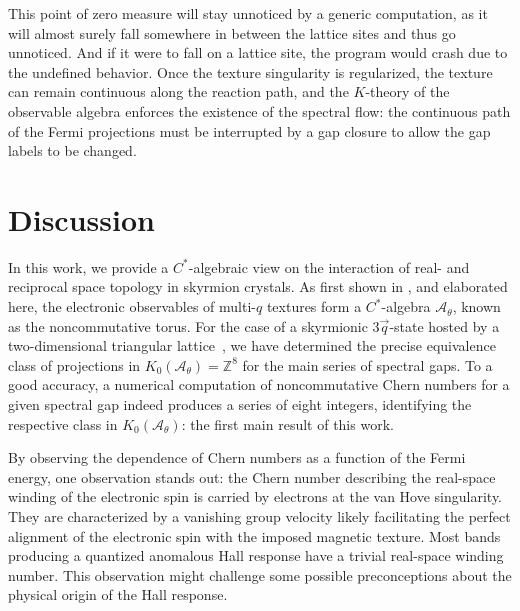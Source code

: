 \documentclass[submission, Phys]{SciPost}
\begin{document}
This point of zero measure will stay unnoticed by a generic computation, as it will almost surely fall somewhere in between the lattice sites and thus go unnoticed.
And if it were to fall on a lattice site, the program would crash due to the undefined behavior.
Once the texture singularity is regularized, the texture can remain continuous along the reaction path, and the $K$-theory of the observable algebra enforces the existence of the spectral flow: the continuous path of the Fermi projections must be interrupted by a gap closure to allow the gap labels to be changed.

\section{Discussion}
\label{sec:conclusion}

In this work, we provide a $C^\ast$-algebraic view on the interaction of real- and reciprocal space topology in skyrmion crystals.
As first shown in \cite{Lux2024}, and elaborated here, the electronic observables of multi-$q$ textures form a $C^\ast$-algebra $\mathcal{A}_\theta$, known as the noncommutative torus. 
For the case of a skyrmionic $3\vec{q}$-state hosted by a two-dimensional triangular lattice~\cite{Gobel2017, Gobel2017b}, we have determined the precise equivalence class of projections in $K_0(\mathcal{A}_\theta)=\mathbb{Z}^8$ for the main series of spectral gaps. 
To a good accuracy, a numerical computation of noncommutative Chern numbers for a given spectral gap indeed produces a series of eight integers, identifying the respective class in $K_0(\mathcal{A}_\theta)$:
the first main result of this work.

By observing the dependence of Chern numbers as a function of the Fermi energy, one observation stands  out:
the Chern number describing the real-space winding of the electronic spin is carried by electrons at the van Hove singularity.
They are characterized by a vanishing group velocity likely facilitating the perfect alignment of the electronic spin with the imposed magnetic texture. 
Most bands producing a quantized anomalous Hall response have a trivial real-space winding number.
This observation might challenge some possible preconceptions about the physical origin of the Hall response.
\end{document}
